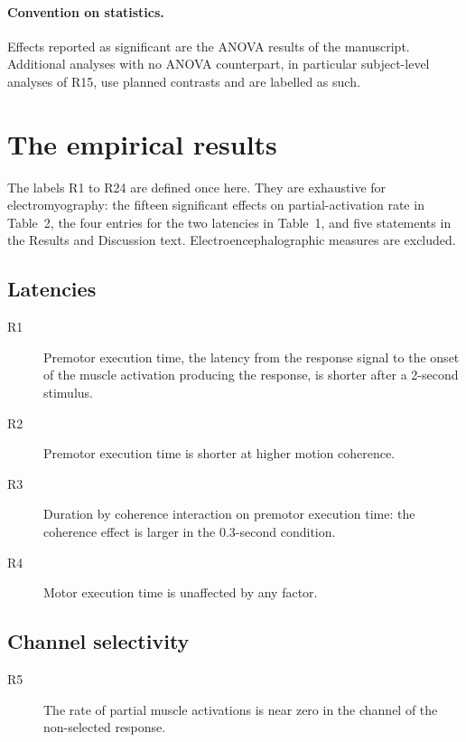 \documentclass[11pt,a4paper]{article}
\theoremstyle{plain}
\theoremstyle{remark}
\begin{document}
\paragraph{Convention on statistics.} Effects reported as significant are the ANOVA results
of the manuscript. Additional analyses with no ANOVA counterpart, in particular
subject-level analyses of R15, use planned contrasts and are labelled as such.

\section{The empirical results}
\label{sec:results}

The labels R1 to R24 are defined once here. They are exhaustive for electromyography: the
fifteen significant effects on partial-activation rate in Table~2, the four entries for the
two latencies in Table~1, and five statements in the Results and Discussion text.
Electroencephalographic measures are excluded.

\subsection{Latencies}

\begin{description}
\item[R1] Premotor execution time, the latency from the response signal to the onset of the
muscle activation producing the response, is shorter after a 2-second stimulus.
\item[R2] Premotor execution time is shorter at higher motion coherence.
\item[R3] Duration by coherence interaction on premotor execution time: the coherence effect
is larger in the 0.3-second condition.
\item[R4] Motor execution time is unaffected by any factor.
\end{description}

\subsection{Channel selectivity}

\begin{description}
\item[R5] The rate of partial muscle activations is near zero in the channel of the
non-selected response.
\end{description}
\end{document}
